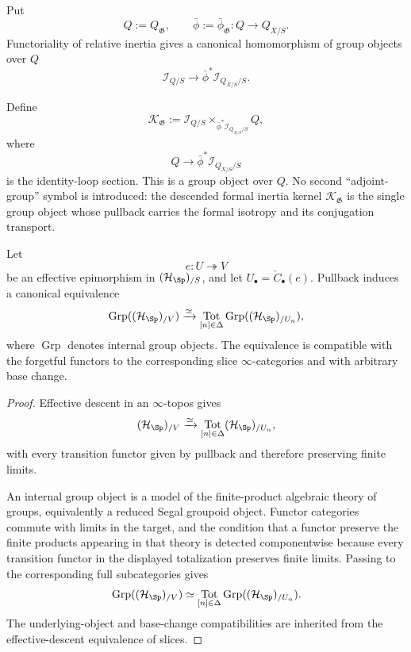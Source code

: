 Put
\[
    Q:=Q_{\mathfrak G},
    \qquad
    \bar\phi:=\bar\phi_{\mathfrak G}:Q\to Q_{X/S}.
\]
Functoriality of relative inertia gives a canonical homomorphism of group objects over
$Q$
\[
    \mathcal I_{Q/S}
    \longrightarrow
    \bar\phi^*\mathcal I_{Q_{X/S}/S}.
\]

\begin{definition}
\label{def:formal-inertia-kernel}
Define
\[
    \mathcal K_{\mathfrak G}
    :=
    \mathcal I_{Q/S}
    \times_{\bar\phi^*\mathcal I_{Q_{X/S}/S}}
    Q,
\]
where
\[
    Q\longrightarrow \bar\phi^*\mathcal I_{Q_{X/S}/S}
\]
is the identity-loop section.  This is a group object over $Q$.  No second
``adjoint-group'' symbol is introduced: the descended formal inertia kernel
$\mathcal K_{\mathfrak G}$ is the single group object whose pullback carries
the formal isotropy and its conjugation transport.
\end{definition}

\begin{lemma}
\label{lem:effective-descent-group-objects}
Let
\[
    e:U\twoheadrightarrow V
\]
be an effective epimorphism in $(\mathcal H_{\Sp})_{/S}$, and let
$U_\bullet=\check C_\bullet(e)$.  Pullback induces a canonical equivalence
\[
    \operatorname{Grp}((\mathcal H_{\Sp})_{/V})
    \xrightarrow{\simeq}
    \operatorname*{Tot}_{[n]\in\Delta}
    \operatorname{Grp}((\mathcal H_{\Sp})_{/U_n}),
\]
where $\operatorname{Grp}$ denotes internal group objects.  The equivalence is
compatible with the forgetful functors to the corresponding slice
$\infty$-categories and with arbitrary base change.
\end{lemma}

\begin{proof}
Effective descent in an $\infty$-topos gives
\[
    (\mathcal H_{\Sp})_{/V}
    \xrightarrow{\simeq}
    \operatorname*{Tot}_{[n]\in\Delta}
    (\mathcal H_{\Sp})_{/U_n},
\]
with every transition functor given by pullback and therefore preserving
finite limits.

An internal group object is a model of the finite-product algebraic theory
of groups, equivalently a reduced Segal groupoid object.  Functor categories
commute with limits in the target, and the condition that a functor preserve
the finite products appearing in that theory is detected componentwise
because every transition functor in the displayed totalization preserves
finite limits.  Passing to the corresponding full subcategories gives
\[
    \operatorname{Grp}((\mathcal H_{\Sp})_{/V})
    \simeq
    \operatorname*{Tot}_{[n]\in\Delta}
    \operatorname{Grp}((\mathcal H_{\Sp})_{/U_n}).
\]
The underlying-object and base-change compatibilities are inherited from the
effective-descent equivalence of slices.
\end{proof}

